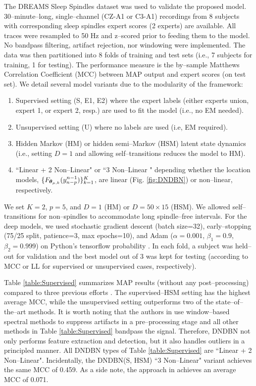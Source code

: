 \documentclass[runningheads]{llncs}
\begin{document}
The DREAMS Sleep Spindles dataset \cite{stephanie_devuyst_2005_2650142} was used to validate the proposed model. 30--minute--long, single--channel (CZ-A1 or C3-A1) recordings from 8 subjects with corresponding sleep spindles expert scores (2 experts) are available. All traces were resampled to 50 Hz and z--scored prior to feeding them to the model. No bandpass filtering, artifact rejection, nor windowing were implemented. The data was then partitioned into 8 folds of training and test sets (i.e., 7 subjects for training, 1 for testing). The performance measure is the by--sample Matthews Correlation Coefficient (MCC) between MAP output and expert scores (on test set). We detail several model variants due to the modularity of the framework: 
\begin{enumerate}[label=\alph*)]
	\item Supervised setting (S, E1, E2) where the expert labels (either experts union, expert 1, or expert 2, resp.) are used to fit the model (i.e., no EM needed).
	\item Unsupervised setting (U) where no labels are used (i.e, EM required).
	\item Hidden Markov (HM) or hidden semi--Markov (HSM) latent state dynamics (i.e., setting $D=1$ and allowing self--transitions reduces the model to HM).
	 \item ``Linear + 2 Non--Linear" or ``3 Non--Linear " depending whether the location models, $\{F_{\text{\boldmath$\theta$\unboldmath}_{\mu, k}}(y_{n-p}^{n-1})\}_{k=1}^K$, are linear (Fig. \ref{fig:DNDBN}) or non--linear, respectively.
\end{enumerate}

We set $K=2$, $p=5$, and $D=1$ (HM) or $D=50\times15$ (HSM). We allowed self--transitions for non--spindles to accommodate long spindle--free intervals. For the deep models, we used stochastic gradient descent (batch size=32), early--stopping (75/25 split, patience=3, max epochs=10), and Adam \cite{kingma2014adam} ($\alpha=0.001$, $\beta_1=0.9$, $\beta_2=0.999$) on Python's tensorflow probability \cite{dillon2017tensorflow}. In each fold, a subject was held--out for validation and the best model out of 3 was kept for testing (according to MCC or LL for supervised or unsupervised cases, respectively).

Table \ref{table:Supervised} summarizes MAP results (without any post--processing) compared to three previous efforts \cite{wendt2012validation,martin2013topography,parekh2014sleep}.
The supervised--HSM setting has the highest average MCC, while the unsupervised setting outperforms two of the state--of--the--art methods. It is worth noting that the authors in \cite{parekh2014sleep} use window--based spectral methods to suppress artifacts in a pre--processing stage and all other methods in Table \ref{table:Supervised} bandpass the signal. Therefore, DNDBN not only performs feature extraction and detection, but it also handles outliers in a principled manner. All DNDBN types of Table \ref{table:Supervised} are ``Linear + 2 Non--Linear". Incidentally, the DNDBN(S, HSM) ``3 Non--Linear" variant achieves the same MCC of 0.459. As a side note, the approach in \cite{penny1999dynamic} achieves an average MCC of 0.071.
\end{document}
